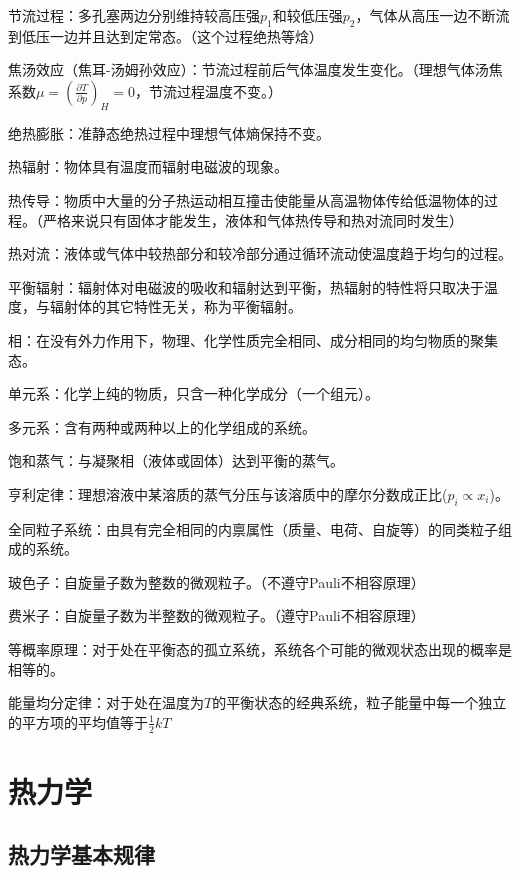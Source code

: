 \documentclass[12pt]{article}
\begin{document}
\noindent
节流过程：多孔塞两边分别维持较高压强$p_1$和较低压强$p_2$，气体从高压一边不断流到低压一边并且达到定常态。（这个过程绝热等焓）

\noindent
焦汤效应（焦耳-汤姆孙效应）：节流过程前后气体温度发生变化。（理想气体汤焦系数$\mu=(\frac{\partial T}{\partial p})_H=0$，节流过程温度不变。）

\noindent
绝热膨胀：准静态绝热过程中理想气体熵保持不变。

\noindent
热辐射：物体具有温度而辐射电磁波的现象。

\noindent
热传导：物质中大量的分子热运动相互撞击使能量从高温物体传给低温物体的过程。（严格来说只有固体才能发生，液体和气体热传导和热对流同时发生）

\noindent
热对流：液体或气体中较热部分和较冷部分通过循环流动使温度趋于均匀的过程。

\noindent
平衡辐射：辐射体对电磁波的吸收和辐射达到平衡，热辐射的特性将只取决于温度，与辐射体的其它特性无关，称为平衡辐射。

\noindent
相：在没有外力作用下，物理、化学性质完全相同、成分相同的均匀物质的聚集态。

\noindent
单元系：化学上纯的物质，只含一种化学成分（一个组元）。

\noindent
多元系：含有两种或两种以上的化学组成的系统。

\noindent
饱和蒸气：与凝聚相（液体或固体）达到平衡的蒸气。

\noindent
亨利定律：理想溶液中某溶质的蒸气分压与该溶质中的摩尔分数成正比($p_i\propto x_i$)。

\noindent
全同粒子系统：由具有完全相同的内禀属性（质量、电荷、自旋等）的同类粒子组成的系统。

\noindent
玻色子：自旋量子数为整数的微观粒子。（不遵守Pauli不相容原理）

\noindent
费米子：自旋量子数为半整数的微观粒子。（遵守Pauli不相容原理）

\noindent
等概率原理：对于处在平衡态的孤立系统，系统各个可能的微观状态出现的概率是相等的。

\noindent
能量均分定律：对于处在温度为$T$的平衡状态的经典系统，粒子能量中每一个独立的平方项的平均值等于$\frac{1}{2}kT$







\newpage
\section{热力学}
\subsection{热力学基本规律}
\end{document}
